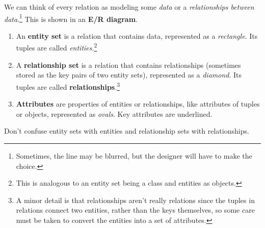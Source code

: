     \begin{definition}
      \label{def:entity-relationship-model}
 
      We can think of every relation as modeling some \textit{data} or a \textit{relationships between data}.\footnote{Sometimes, the line may be blurred, but the designer will have to make the choice.} This is shown in an \textbf{E/R diagram}. 
      \begin{enumerate}
        \item An \textbf{entity set} is a relation that contains data, represented as a \textit{rectangle}. Its tuples are called \textit{entities}.\footnote{This is analogous to an entity set being a class and entities as objects.} 
        \item A \textbf{relationship set} is a relation that contains relationships (sometimes stored as the key pairs of two entity sets), represented as a \textit{diamond}. Its tuples are called \textbf{relationships}.\footnote{A minor detail is that relationships aren't really relations since the tuples in relations connect two entities, rather than the keys themselves, so some care must be taken to convert the entities into a set of attributes. }
        \item \textbf{Attributes} are properties of entities or relationships, like attributes of tuples or objects, represented as \textit{ovals}. Key attributes are underlined. 
      \end{enumerate}
      Don't confuse entity sets with entities and relationship sets with relationships. 
    \end{definition}

